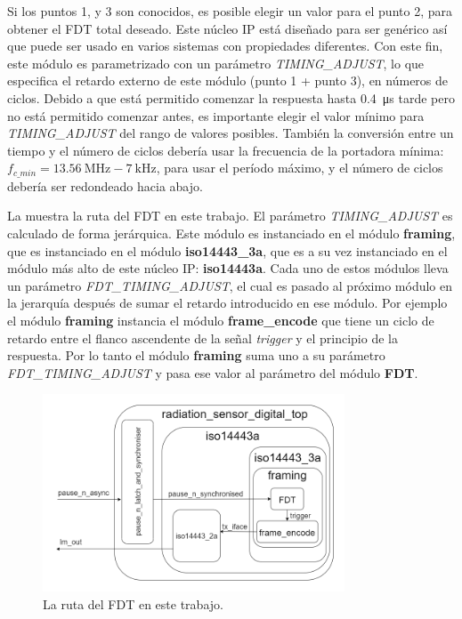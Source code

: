 \documentclass[a4paper, twoside, 11pt]{report}
\begin{document}
Si los puntos 1, y 3 son conocidos, es posible elegir un valor para el punto 2, para obtener el FDT total deseado. Este núcleo IP está diseñado para ser genérico así que puede ser usado en varios sistemas con propiedades diferentes. Con este fin, este módulo es parametrizado con un parámetro \textit{TIMING\_ADJUST}, lo que especifica el retardo externo de este módulo (punto 1 + punto 3), en números de ciclos. Debido a que está permitido comenzar la respuesta hasta \SI{0,4}{\micro\second} tarde pero no está permitido comenzar antes, es importante elegir el valor mínimo para  \textit{TIMING\_ADJUST} del rango de valores posibles. También la conversión entre un tiempo y el número de ciclos debería usar la frecuencia de la portadora mínima: $f_{c\_min} = \SI{13.56}{\mega\hertz} - \SI{7}{\kilo\hertz}$, para usar el período máximo, y el número de ciclos debería ser redondeado hacia abajo.

La  muestra la ruta del FDT en este trabajo. El parámetro \textit{TIMING\_ADJUST} es calculado de forma jerárquica. Este módulo es instanciado en el módulo \textbf{framing}, que es instanciado en el módulo \textbf{iso14443\_3a}, que es a su vez instanciado en el módulo más alto de este núcleo IP: \textbf{iso14443a}. Cada uno de estos módulos lleva un parámetro \textit{FDT\_TIMING\_ADJUST}, el cual es pasado al próximo módulo en la jerarquía después de sumar el retardo introducido en ese módulo. Por ejemplo el módulo \textbf{framing} instancia el módulo \textbf{frame\_encode} que tiene un ciclo de retardo entre el flanco ascendente de la señal \textit{trigger} y el principio de la respuesta. Por lo tanto el módulo \textbf{framing} suma uno a su parámetro \textit{FDT\_TIMING\_ADJUST} y pasa ese valor al parámetro del módulo \textbf{FDT}.

\begin{figure}[htb]
  \centering
  \includegraphics[width=0.8\textwidth]{./img/fdt_path3.drawio}
  \caption{La ruta del FDT en este trabajo.}
  \label{fig:fdt_path}
\end{figure}
\end{document}

